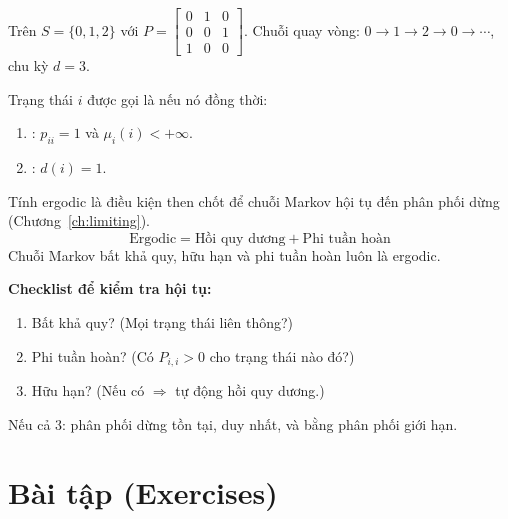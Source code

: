 \begin{example}
Trên $S = \{0, 1, 2\}$ với $P = \begin{bmatrix} 0 & 1 & 0 \\ 0 & 0 & 1 \\ 1 & 0 & 0 \end{bmatrix}$.
Chuỗi quay vòng: $0 \to 1 \to 2 \to 0 \to \cdots$, chu kỳ $d = 3$.
\end{example}


\begin{dinhnghia}
Trạng thái $i$ được gọi là  nếu nó đồng thời:
\begin{enumerate}[label=(\roman*)]
  \item {}: $p_{ii} = 1$ và $\mu_i(i) < +\infty$.
  \item {}: $d(i) = 1$.
\end{enumerate}
\end{dinhnghia}

\begin{tomtat}
Tính ergodic là điều kiện then chốt để chuỗi Markov hội tụ đến phân phối dừng (Chương~\ref{ch:limiting}).
\[
  \boxed{\text{Ergodic} = \text{Hồi quy dương} + \text{Phi tuần hoàn}}
\]
Chuỗi Markov bất khả quy, hữu hạn và phi tuần hoàn luôn là ergodic.

\medskip
\textbf{Checklist để kiểm tra hội tụ:}
\begin{enumerate}[nosep]
  \item Bất khả quy? (Mọi trạng thái liên thông?)
  \item Phi tuần hoàn? (Có $P_{i,i} > 0$ cho trạng thái nào đó?)
  \item Hữu hạn? (Nếu có $\Rightarrow$ tự động hồi quy dương.)
\end{enumerate}
Nếu cả 3: phân phối dừng tồn tại, duy nhất, và bằng phân phối giới hạn.
\end{tomtat}

\section{Bài tập (Exercises)}
\label{sec:ch6-exercises}

